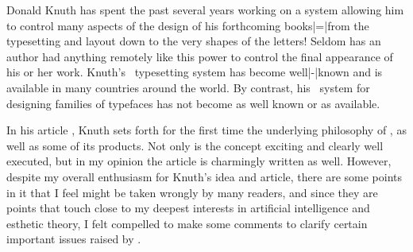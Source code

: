 Donald Knuth has spent the past several years working on a
system allowing him to control many aspects of the design
of his forthcoming books|=|from the typesetting and layout
down to the very shapes of the letters! Seldom has an
author had anything remotely like this power to control the
final appearance of his or her work. Knuth's \TEX\
typesetting system has become well|-|known and is available in
many countries around the world. By contrast, his
\METAFONT\ system for designing families of typefaces has
not become as well known or as available.

In his article ,
Knuth sets forth for the first time the underlying
philosophy of \METAFONT, as well as some of its products.
Not only is the concept exciting and clearly well executed,
but in my opinion the article is charmingly written as well.
However, despite my overall enthusiasm for Knuth's idea and
article, there are some points in it that I feel might be
taken wrongly by many readers, and since they are points
that touch close to my deepest interests in artificial
intelligence and esthetic theory, I felt compelled to make
some comments to clarify certain important issues raised by
.
